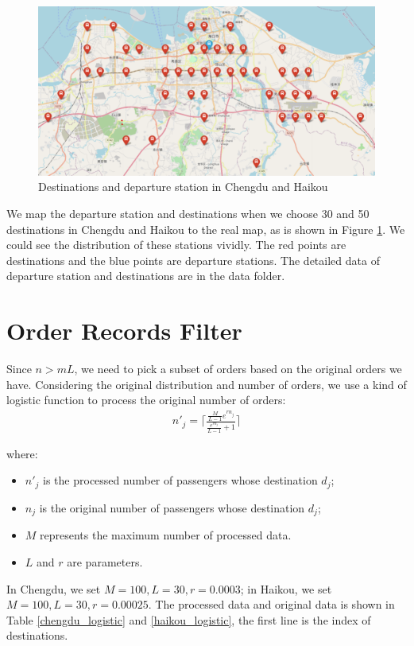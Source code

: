 \documentclass{llncs}
\begin{document}
\begin{figure}
{\begin{minipage}[t]{0.45\textwidth}
				\centering
				\includegraphics[width=\textwidth]{Haikou50.PNG}
			\end{minipage}
		}
    \caption{Destinations and departure station in Chengdu and Haikou}
    \label{fig:map}
\end{figure}

We map the departure station and destinations when we choose 30 and 50 destinations in Chengdu and Haikou to the real map, as is shown in Figure \ref{fig:map}. We could see the distribution of these stations vividly. The red points are destinations and the blue points are departure stations. The detailed data of departure station and destinations are in the data folder. 

\section{Order Records Filter}
Since $n>mL$, we need to pick a subset of orders based on the original orders we have. Considering the original distribution and number of orders, we use a kind of logistic function to process the original number of orders:
	\begin{align}
	n'_j=\lceil \frac{\frac{M}{L-1}e^{rn_j}}{\frac{e^{rn_j}}{L-1}+1}\rceil
	\end{align}
	
	where:
	\begin{itemize}
		\item $n'_j$ is the processed number of passengers whose destination $d_j$;
		\item $n_j$ is the original number of passengers whose destination $d_j$;
		\item $M$ represents the maximum number of processed data.
		\item $L$ and $r$ are parameters.
	\end{itemize}

	In Chengdu, we set $M=100,L=30,r=0.0003$; in Haikou, we set $M=100,L=30,r=0.00025$. The processed data and original data is shown in Table \ref{chengdu_logistic} and \ref{haikou_logistic}, the first line is the index of destinations.
	
\end{document}

